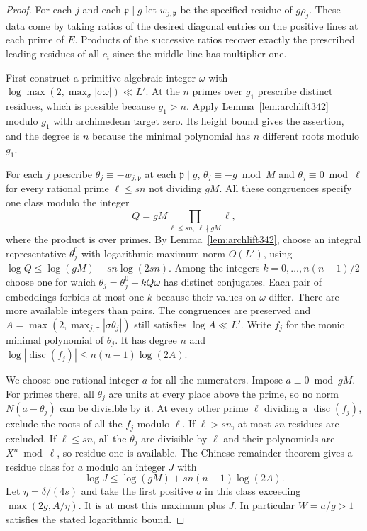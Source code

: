 \documentclass[a4paper,11pt]{article}
\theoremstyle{definition}
\theoremstyle{remark}
\numberwithin{equation}{section}
\begin{document}
\begin{proof}
For each $j$ and each $\mathfrak p\mid g$ let $w_{j,\mathfrak p}$
be the specified residue of $g\rho_j$. These data come by taking
ratios of the desired diagonal entries on the positive lines at
each prime of $E$. Products of the successive ratios recover
exactly the prescribed leading residues of all $c_i$ since the
middle line has multiplier one.

First construct a primitive algebraic integer $\omega$ with
$\log\max(2,\max_\sigma|\sigma\omega|)\ll L'$. At the $n$ primes
over $g_1$ prescribe distinct residues, which is possible because
$g_1>n$. Apply Lemma~\ref{lem:archlift342} modulo $g_1$ with
archimedean target zero. Its height bound gives the assertion,
and the degree is $n$ because the minimal polynomial has $n$
different roots modulo $g_1$.

For each $j$ prescribe $\theta_j\equiv-w_{j,\mathfrak p}$ at each
$\mathfrak p\mid g$, $\theta_j\equiv-g\bmod M$ and
$\theta_j\equiv0\bmod\ell$ for every rational prime
$\ell\le sn$ not dividing $gM$. All these congruences specify
one class modulo the integer
\[
                     Q=gM\prod_{\ell\le sn,\ \ell\nmid gM}\ell ,
\]
where the product is over primes. By
Lemma~\ref{lem:archlift342}, choose an integral representative
$\theta_j^0$ with logarithmic maximum norm $O(L')$, using
$\log Q\le\log(gM)+sn\log(2sn)$. Among the integers
$k=0,\ldots,n(n-1)/2$ choose one for which
$\theta_j=\theta_j^0+kQ\omega$ has distinct conjugates. Each
pair of embeddings forbids at most one $k$ because their values
on $\omega$ differ. There are more available integers than
pairs. The congruences are preserved and
$A=\max(2,\max_{j,\sigma}|\sigma\theta_j|)$ still satisfies
$\log A\ll L'$. Write $f_j$ for the monic minimal polynomial of
$\theta_j$. It has degree $n$ and
$\log|\operatorname{disc}(f_j)|\le n(n-1)\log(2A)$.

We choose one rational integer $a$ for all the numerators. Impose
$a\equiv0\bmod gM$. For primes there, all $\theta_j$ are units
at every place above the prime, so no norm $N(a-\theta_j)$ can be
divisible by it. At every other prime $\ell$ dividing a
$\operatorname{disc}(f_j)$, exclude the roots of all the $f_j$
modulo $\ell$. If $\ell>sn$, at most $sn$ residues are excluded.
If $\ell\le sn$, all the $\theta_j$ are divisible by $\ell$ and
their polynomials are $X^n\bmod\ell$, so residue one is available.
The Chinese remainder theorem gives a residue class for $a$ modulo
an integer $J$ with
\[
                \log J\le\log(gM)+sn(n-1)\log(2A).
\]
Let $\eta=\delta/(4s)$ and take the first positive $a$ in this
class exceeding $\max(2g,A/\eta)$. It is at most this maximum
plus $J$. In particular $W=a/g>1$ satisfies the stated logarithmic
bound.


\end{proof}
\end{document}
